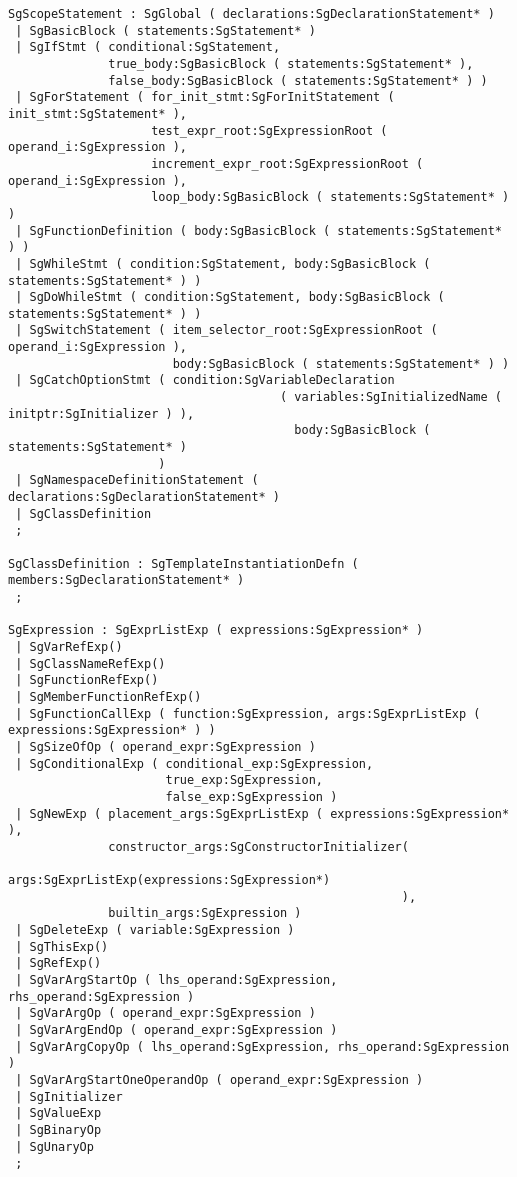 \begin{verbatim}
SgScopeStatement : SgGlobal ( declarations:SgDeclarationStatement* )
 | SgBasicBlock ( statements:SgStatement* )
 | SgIfStmt ( conditional:SgStatement, 
              true_body:SgBasicBlock ( statements:SgStatement* ), 
              false_body:SgBasicBlock ( statements:SgStatement* ) )
 | SgForStatement ( for_init_stmt:SgForInitStatement ( init_stmt:SgStatement* ), 
                    test_expr_root:SgExpressionRoot ( operand_i:SgExpression ), 
                    increment_expr_root:SgExpressionRoot ( operand_i:SgExpression ), 
                    loop_body:SgBasicBlock ( statements:SgStatement* ) )
 | SgFunctionDefinition ( body:SgBasicBlock ( statements:SgStatement* ) )
 | SgWhileStmt ( condition:SgStatement, body:SgBasicBlock ( statements:SgStatement* ) )
 | SgDoWhileStmt ( condition:SgStatement, body:SgBasicBlock ( statements:SgStatement* ) )
 | SgSwitchStatement ( item_selector_root:SgExpressionRoot ( operand_i:SgExpression ), 
                       body:SgBasicBlock ( statements:SgStatement* ) )
 | SgCatchOptionStmt ( condition:SgVariableDeclaration
                                      ( variables:SgInitializedName ( initptr:SgInitializer ) ), 
                                        body:SgBasicBlock ( statements:SgStatement* ) 
                     )
 | SgNamespaceDefinitionStatement ( declarations:SgDeclarationStatement* )
 | SgClassDefinition
 ;

SgClassDefinition : SgTemplateInstantiationDefn ( members:SgDeclarationStatement* )
 ;

SgExpression : SgExprListExp ( expressions:SgExpression* )
 | SgVarRefExp()
 | SgClassNameRefExp()
 | SgFunctionRefExp()
 | SgMemberFunctionRefExp()
 | SgFunctionCallExp ( function:SgExpression, args:SgExprListExp ( expressions:SgExpression* ) )
 | SgSizeOfOp ( operand_expr:SgExpression )
 | SgConditionalExp ( conditional_exp:SgExpression, 
                      true_exp:SgExpression, 
                      false_exp:SgExpression )
 | SgNewExp ( placement_args:SgExprListExp ( expressions:SgExpression* ), 
              constructor_args:SgConstructorInitializer(
                                           args:SgExprListExp(expressions:SgExpression*)
                                                       ), 
              builtin_args:SgExpression )
 | SgDeleteExp ( variable:SgExpression )
 | SgThisExp()
 | SgRefExp()
 | SgVarArgStartOp ( lhs_operand:SgExpression, rhs_operand:SgExpression )
 | SgVarArgOp ( operand_expr:SgExpression )
 | SgVarArgEndOp ( operand_expr:SgExpression )
 | SgVarArgCopyOp ( lhs_operand:SgExpression, rhs_operand:SgExpression )
 | SgVarArgStartOneOperandOp ( operand_expr:SgExpression )
 | SgInitializer
 | SgValueExp
 | SgBinaryOp
 | SgUnaryOp
 ;


\end{verbatim}
